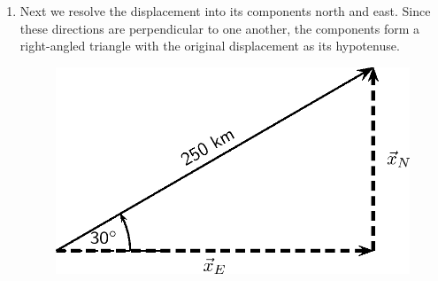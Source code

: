 {\begin{mdframed}[linewidth=4, leftmargin=40, rightmargin=40]
\begin{exercise}
\begin{enumerate}[noitemsep, label=\textbf{Step} \textbf{\arabic*}. ]
\begin{figure}[H]
\begin{center}
      \vspace{2pt}
    \vspace{.1in}
    
    \end{center}

 \end{figure}   

    \addtocounter{footnote}{-0}
    
      \par 
      \item  
      \label{m38819*id193100}Next we resolve the displacement into its components north and
east. Since these directions are perpendicular to one another, the
components form a right-angled triangle with the original displacement
as its hypotenuse.\par 
      \label{m38819*id193105}
        
    \setcounter{subfigure}{0}


	\begin{figure}[H] %
    \begin{center}
    \label{m38819*id193109!!!underscore!!!media}\label{m38819*id193109!!!underscore!!!printimage}\includegraphics{col11305.imgs/m38819_PG11C1_061.png} %
        
      \vspace{2pt}
    \vspace{.1in}
    
    \end{center}

 \end{figure}   

    \addtocounter{footnote}{-0}
    

\end{enumerate}
\end{exercise}
\end{mdframed}}
